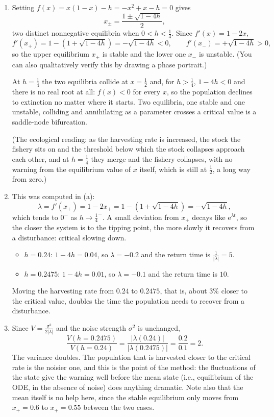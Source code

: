\documentclass[a4paper,12pt]{article}
\begin{document}
\begin{enumerate}[label=(\alph*)]
\item Setting $f(x)=x(1-x)-h = -x^2+x-h = 0$ gives
\[ x_{\pm} = \frac{1 \pm \sqrt{1-4h}}{2} , \]
two distinct nonnegative equilibria when $0<h<\frac{1}{4}$. Since $f'(x) = 1-2x$,
\[ f'(x_+) = 1-\left( 1+\sqrt{1-4h} \right) = -\sqrt{1-4h} < 0,
\qquad
f'(x_-) = +\sqrt{1-4h} > 0 , \]
so the upper equilibrium $x_+$ is stable and the lower one $x_-$ is unstable. (You can also qualitatively verify this by drawing a phase portrait.)

At $h=\frac{1}{4}$ the two equilibria collide at $x=\frac{1}{2}$ and, for $h>\frac{1}{4}$, $1-4h<0$ and there is no real root at all: $f(x)<0$ for every $x$, so the population declines to extinction no matter where it starts. Two equilibria, one stable and one unstable, colliding and annihilating as a parameter crosses a critical value is a saddle-node bifurcation.

(The ecological reading: as the harvesting rate is increased, the stock the fishery sits on and the threshold below which the stock collapses approach each other, and at $h=\frac{1}{4}$ they merge and the fishery collapses, with no warning from the equilibrium value of $x$ itself, which is still at $\frac{1}{2}$, a long way from zero.)

\item This was computed in (a):
\[ \lambda = f'(x_+) = 1-2x_+ = 1 - \left( 1+\sqrt{1-4h} \right) = -\sqrt{1-4h} , \]
which tends to $0^-$ as $h \to \frac{1}{4}^-$. A small deviation from $x_+$ decays like $\text{e}^{\lambda t}$, so the closer the system is to the tipping point, the more slowly it recovers from a disturbance: critical slowing down.
\begin{itemize}
\item $h=0.24$: $1-4h = 0.04$, so $\lambda = -0.2$ and the return time is $\frac{1}{\left| \lambda \right|}=5$.
\item $h=0.2475$: $1-4h = 0.01$, so $\lambda = -0.1$ and the return time is $10$.
\end{itemize}
Moving the harvesting rate from $0.24$ to $0.2475$, that is, about $3\%$ closer to the critical value, doubles the time the population needs to recover from a disturbance.

\item Since $V = \frac{\sigma^2}{2\left| \lambda \right|}$ and the noise strength $\sigma^2$ is unchanged,
\[ \frac{V(h=0.2475)}{V(h=0.24)} = \frac{\left| \lambda(0.24) \right|}{\left| \lambda(0.2475) \right|} = \frac{0.2}{0.1} = 2 . \]
The variance doubles. The population that is harvested closer to the critical rate is the noisier one, and this is the point of the method: the fluctuations of the state give the warning well before the mean state (i.e., equilibrium of the ODE, in the absence of noise) does anything dramatic. Note also that the mean itself is no help here, since the stable equilibrium only moves from $x_+=0.6$ to $x_+=0.55$ between the two cases.
\end{enumerate}
\end{document}
